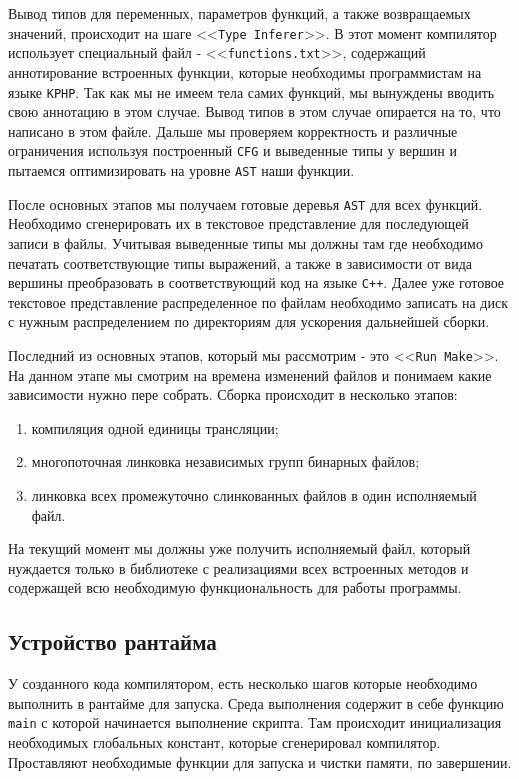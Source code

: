 Вывод типов для переменных, параметров функций, а также возвращаемых значений, происходит на шаге <<\verb|Type Inferer|>>.
В этот момент компилятор использует специальный файл - <<\verb|functions.txt|>>, содержащий аннотирование встроенных функции, которые необходимы программистам на языке \verb|KPHP|.
Так как мы не имеем тела самих функций, мы вынуждены вводить свою аннотацию в этом случае.
Вывод типов в этом случае опирается на то, что написано в этом файле.
Дальше мы проверяем корректность и различные ограничения используя построенный \verb|CFG| и выведенные типы у вершин и пытаемся оптимизировать на уровне \verb|AST| наши функции.

После основных этапов мы получаем готовые деревья \verb|AST| для всех функций.
Необходимо сгенерировать их в текстовое представление для последующей записи в файлы.
Учитывая выведенные типы мы должны там где необходимо печатать соответствующие типы выражений, а также в зависимости от вида вершины преобразовать в соответствующий код на языке \verb|C++|.
Далее уже готовое текстовое представление распределенное по файлам необходимо записать на диск с нужным распределением по директориям для ускорения дальнейшей сборки.

Последний из основных этапов, который мы рассмотрим - это <<\verb|Run Make|>>.
На данном этапе мы смотрим на времена изменений файлов и понимаем какие зависимости нужно пере собрать.
Сборка происходит в несколько этапов:
\begin{enumerate}
  \item компиляция одной единицы трансляции;
  \item многопоточная линковка независимых групп бинарных файлов;
  \item линковка всех промежуточно слинкованных файлов в один исполняемый файл.
\end{enumerate}

На текущий момент мы должны уже получить исполняемый файл, который нуждается только в библиотеке с реализациями всех встроенных методов и содержащей всю необходимую функциональность для работы программы.

\subsection{Устройство рантайма}
У созданного кода компилятором, есть несколько шагов которые необходимо выполнить в рантайме для запуска.
Среда выполнения содержит в себе функцию \verb|main| с которой начинается выполнение скрипта.
Там происходит инициализация необходимых глобальных констант, которые сгенерировал компилятор.
Проставляют необходимые функции для запуска и чистки памяти, по завершении.

